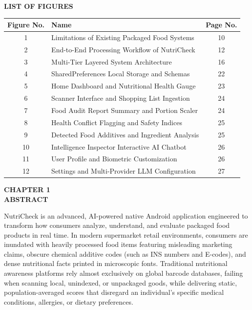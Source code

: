 \documentclass[12pt]{article}
\begin{document}
\vspace{1cm}

\begin{center}
\textbf{\Large LIST OF FIGURES}
\end{center}

\vspace{1cm}

\renewcommand{\arraystretch}{1.5}
\begin{center}
\large
\begin{tabular}{|c|p{9.5cm}|c|}
\hline
\textbf{Figure No.} & \textbf{Name} & \textbf{Page No.} \\
\hline
1 & Limitations of Existing Packaged Food Systems & 10 \\
\hline
2 & End-to-End Processing Workflow of NutriCheck & 12 \\
\hline
3 & Multi-Tier Layered System Architecture & 16 \\
\hline
4 & SharedPreferences Local Storage and Schemas & 22 \\
\hline
5 & Home Dashboard and Nutritional Health Gauge & 23 \\
\hline
6 & Scanner Interface and Shopping List Ingestion & 24 \\
\hline
7 & Food Audit Report Summary and Portion Scaler & 24 \\
\hline
8 & Health Conflict Flagging and Safety Indices & 25 \\
\hline
9 & Detected Food Additives and Ingredient Analysis & 25 \\
\hline
10 & Intelligence Inspector Interactive AI Chatbot & 26 \\
\hline
11 & User Profile and Biometric Customization & 26 \\
\hline
12 & Settings and Multi-Provider LLM Configuration & 27 \\
\hline
\end{tabular}
\end{center}

\newpage
{}
\setcounter{page}{1}

\begin{center}
\textbf{\Large CHAPTER 1}\\[0.5cm]
\textbf{\Large ABSTRACT}\\[1cm]
\end{center}

\noindent
NutriCheck is an advanced, AI-powered native Android application engineered to transform how consumers analyze, understand, and evaluate packaged food products in real time. In modern supermarket retail environments, consumers are inundated with heavily processed food items featuring misleading marketing claims, obscure chemical additive codes (such as INS numbers and E-codes), and dense nutritional facts printed in microscopic fonts. Traditional nutritional awareness platforms rely almost exclusively on global barcode databases, failing when scanning local, unindexed, or unpackaged goods, while delivering static, population-averaged scores that disregard an individual's specific medical conditions, allergies, or dietary preferences.
\end{document}
